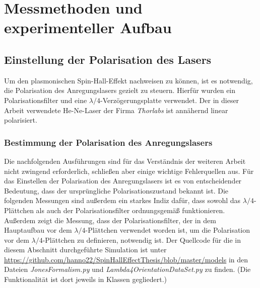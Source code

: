 \documentclass[titlepage,  ngerman]{article}
\begin{document}
	\section{Messmethoden und experimenteller Aufbau}
	\subsection{Einstellung der Polarisation des Lasers}
	\label{sec:cntr_pol}
	Um den plasmonischen Spin-Hall-Effekt nachweisen zu können, ist es notwendig, die Polarisation des Anregungslasers gezielt zu steuern. Hierfür wurden ein Polarisationsfilter und eine $\lambda /4$-Verzögerungsplatte verwendet. Der in dieser Arbeit verwendete He-Ne-Laser der Firma \textit{Thorlabs} ist annähernd linear polarisiert.
	\subsubsection{Bestimmung der Polarisation des Anregungslasers}
	\label{sec:polarimeter}
	Die nachfolgenden Ausführungen sind für das Verständnis der weiteren Arbeit nicht zwingend erforderlich, schließen aber einige wichtige Fehlerquellen aus. Für das Einstellen der Polarisation des Anregungslasers ist es von entscheidender Bedeutung, dass der ursprüngliche Polarisationszustand bekannt ist. Die folgenden Messungen sind außerdem ein starkes Indiz dafür, dass sowohl das $\lambda/4$-Plättchen als auch der Polarisationsfilter ordnungsgemäß funktionieren. Außerdem zeigt die Messung, dass der Polarisationsfilter, der in dem Hauptaufbau vor dem $\lambda / 4$-Plättchen verwendet worden ist, um die Polarisation vor dem $\lambda / 4$-Plättchen zu definieren, notwendig ist. Der Quellcode für die in diesem Abschnitt durchgeführte Simulation ist unter \url{https://github.com/hanno22/SpinHallEffectThesis/blob/master/models} in den Dateien \textit{JonesFormalism.py} und \textit{Lambda4OrientationDataSet.py} zu finden. (Die Funktionalität ist dort jeweils in Klassen gegliedert.)
\end{document}
